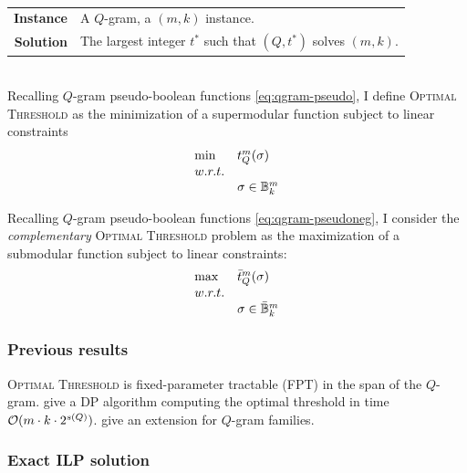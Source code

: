 \paragraph{}
\begin{tabular}{rl}
{\bf Instance}	&	A $Q$-gram, a $(m,k)$ instance.\\
{\bf Solution}	&	The largest integer $t^*$ such that $(Q,t^*)$ solves $(m,k)$.\\
\end{tabular}
\\

Recalling $Q$-gram pseudo-boolean functions \ref{eq:qgram-pseudo}, I define \textsc{Optimal Threshold} as the minimization of a supermodular function subject to linear constraints
\begin{equation}
\begin{array}{ll}
\text{min} & t_{Q}^{m} (\sigma)			\\
w.r.t.								\\
& \sigma \in \mathbb {B}^m_k				\\
\end{array}
\end{equation}

Recalling $Q$-gram pseudo-boolean functions \ref{eq:qgram-pseudoneg}, I consider the \emph{complementary} \textsc{Optimal Threshold} problem as the maximization of a submodular function subject to linear constraints:
\begin{equation}
\begin{array}{ll}
\text{max} & \bar{t}_{Q}^{m} (\sigma)		\\
w.r.t.								\\
& \sigma \in \bar{\mathbb {B}}^m_k			\\
\end{array}
\end{equation}

\subsubsection{Previous results}

\textsc{Optimal Threshold} is fixed-parameter tractable (FPT) in the span of the $Q$-gram.
 \cite{Burkhardt2001} give a DP algorithm computing the optimal threshold in time $\mathcal{O}(m \cdot k \cdot 2^{s(Q)})$.
\cite{Kucherov2005} give an extension for $Q$-gram families.

\subsubsection{Exact ILP solution}

